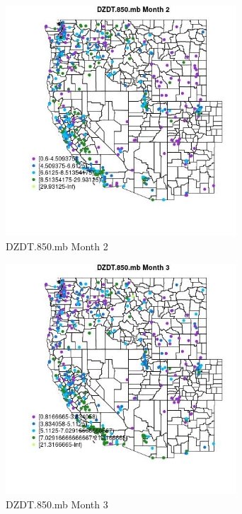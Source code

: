 \begin{figure} 
\centering  
\includegraphics[width=0.77\textwidth]{Code_Outputs/ML_input_report_ML_input_PM25_Step5_part_d_de_duplicated_aves_ML_input_MapObsMo2DZDT850mb.jpg} 
\caption{\label{fig:ML_input_report_ML_input_PM25_Step5_part_d_de_duplicated_aves_ML_inputMapObsMo2DZDT850mb}DZDT.850.mb Month 2} 
\end{figure} 
 

\begin{figure} 
\centering  
\includegraphics[width=0.77\textwidth]{Code_Outputs/ML_input_report_ML_input_PM25_Step5_part_d_de_duplicated_aves_ML_input_MapObsMo3DZDT850mb.jpg} 
\caption{\label{fig:ML_input_report_ML_input_PM25_Step5_part_d_de_duplicated_aves_ML_inputMapObsMo3DZDT850mb}DZDT.850.mb Month 3} 
\end{figure} 
 

